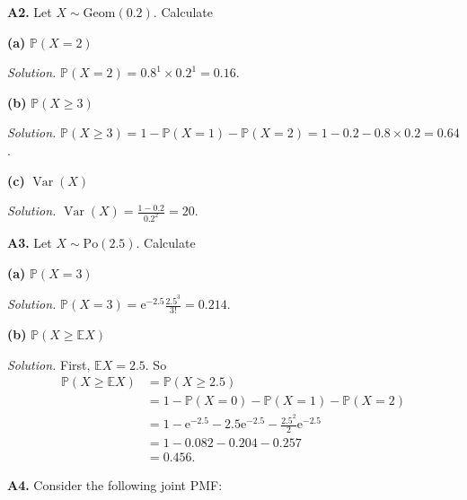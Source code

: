 \documentclass[
  a4paper,
]{book}
\theoremstyle{definition}
\theoremstyle{definition}
\theoremstyle{definition}
\theoremstyle{definition}
\theoremstyle{remark}
\begin{document}
\textbf{A2.} Let \(X \sim \text{Geom}(0.2)\). Calculate

\textbf{(a)} \(\mathbb P(X = 2)\)

\begin{myanswers}
\emph{Solution.} \(\mathbb P(X = 2) = 0.8^1 \times 0.2^1 = 0.16\).

\end{myanswers}

\textbf{(b)} \(\mathbb P(X \geq 3)\)

\begin{myanswers}
\emph{Solution.} \(\mathbb P(X \geq 3) = 1 - \mathbb P(X =1) - \mathbb P(X = 2) = 1 - 0.2 - 0.8\times 0.2 = 0.64\).

\end{myanswers}

\textbf{(c)} \(\operatorname{Var}(X)\)

\begin{myanswers}
\emph{Solution.} \({\displaystyle \operatorname{Var}(X) = \frac{1 - 0.2}{0.2^2} = 20}\).

\end{myanswers}

\textbf{A3.} Let \(X \sim \text{Po}(2.5)\). Calculate

\textbf{(a)} \(\mathbb P(X = 3)\)

\begin{myanswers}
\emph{Solution.}
\(\mathbb P(X = 3) = \mathrm e^{-2.5} \displaystyle\frac{2.5^3}{3!} = 0.214\).

\end{myanswers}

\textbf{(b)} \(\mathbb P(X \geq \mathbb EX)\)

\begin{myanswers}
\emph{Solution.} First, \(\mathbb EX = 2.5\). So
\begin{align*}
\mathbb P(X \geq \mathbb EX) &= \mathbb P(X \geq 2.5) \\
  &= 1 - \mathbb P(X = 0) - \mathbb P(X = 1) - \mathbb P(X = 2) \\
  &= 1 - \mathrm e^{-2.5} - 2.5 \mathrm e^{-2.5} - \frac{2.5^2}{2} \mathrm e^{-2.5} \\
  &= 1 - 0.082 - 0.204 - 0.257 \\
  &= 0.456.
\end{align*}

\end{myanswers}

\textbf{A4.} Consider the following joint PMF:
\end{document}
